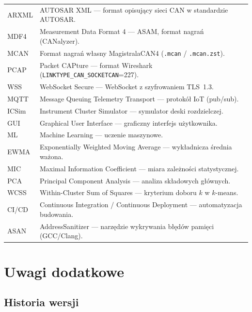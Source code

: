 \documentclass[12pt, a4paper]{article}
\begin{document}
\begin{table}[H]
\begin{tabular}{p{3.0cm}p{11.5cm}}
ARXML    & AUTOSAR XML --- format opisujący sieci CAN w standardzie AUTOSAR. \\
MDF4     & Measurement Data Format 4 --- ASAM, format nagrań (CANalyzer). \\
MCAN     & Format nagrań własny MagistralaCAN4 (\texttt{.mcan} / \texttt{.mcan.zst}). \\
PCAP     & Packet CAPture --- format Wireshark (\texttt{LINKTYPE\_CAN\_SOCKETCAN}=227). \\
WSS      & WebSocket Secure --- WebSocket z szyfrowaniem TLS~1.3. \\
MQTT     & Message Queuing Telemetry Transport --- protokół IoT (pub/sub). \\
ICSim    & Instrument Cluster Simulator --- symulator deski rozdzielczej. \\
GUI      & Graphical User Interface --- graficzny interfejs użytkownika. \\
ML       & Machine Learning --- uczenie maszynowe. \\
EWMA     & Exponentially Weighted Moving Average --- wykładnicza średnia ważona. \\
MIC      & Maximal Information Coefficient --- miara zależności statystycznej. \\
PCA      & Principal Component Analysis --- analiza składowych głównych. \\
WCSS     & Within-Cluster Sum of Squares --- kryterium doboru $k$ w $k$-means. \\
CI/CD    & Continuous Integration / Continuous Deployment --- automatyzacja budowania. \\
ASAN     & AddressSanitizer --- narzędzie wykrywania błędów pamięci (GCC/Clang). \\
\bottomrule
\end{tabular}
\end{table}

\section{Uwagi dodatkowe}

\subsection{Historia wersji}
\end{document}
